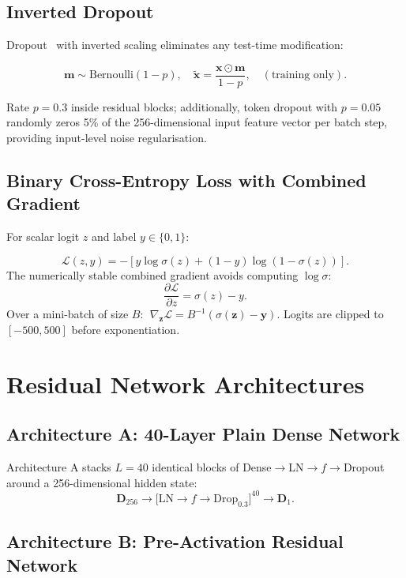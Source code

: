 \documentclass[10pt,conference,letterpaper]{IEEEtran}
\begin{document}
\subsection{Inverted Dropout}

Dropout~\cite{srivastava2014dropout} with inverted scaling eliminates any
test-time modification:
\begin{tcolorbox}[eqbox]
\[
  \bm{m}\sim\mathrm{Bernoulli}(1{-}p),\quad
  \tilde{\bm{x}} = \frac{\bm{x}\odot\bm{m}}{1-p},\quad (\text{training only}).
\]
\end{tcolorbox}
Rate $p=0.3$ inside residual blocks; additionally, token dropout with $p=0.05$
randomly zeros 5\% of the 256-dimensional input feature vector per batch step,
providing input-level noise regularisation.

\subsection{Binary Cross-Entropy Loss with Combined Gradient}

For scalar logit $z$ and label $y\in\{0,1\}$:
\begin{tcolorbox}[eqbox]
\[
  \mathcal{L}(z,y) = -\left[y\log\sigma(z)+(1-y)\log(1-\sigma(z))\right].
\]
The numerically stable combined gradient avoids computing $\log\sigma$:
\[
  \frac{\partial\mathcal{L}}{\partial z} = \sigma(z)-y.
\]
Over a mini-batch of size $B$:
$\;\nabla_{\bm{z}}\mathcal{L} = B^{-1}(\sigma(\bm{z})-\bm{y}).$
Logits are clipped to $[-500,500]$ before exponentiation.
\end{tcolorbox}

\section{Residual Network Architectures}
\label{sec:arch}

\subsection{Architecture A: 40-Layer Plain Dense Network}

Architecture A stacks $L=40$ identical blocks of Dense$\to$LN$\to f\to$Dropout
around a 256-dimensional hidden state:
\[
  \mathbf{D}_{256} \to
  \bigl[\mathrm{LN}\to f\to\mathrm{Drop}_{0.3}\bigr]^{40}
  \to\mathbf{D}_1.
\]

\subsection{Architecture B: Pre-Activation Residual Network}
\label{sec:archB}
\end{document}
